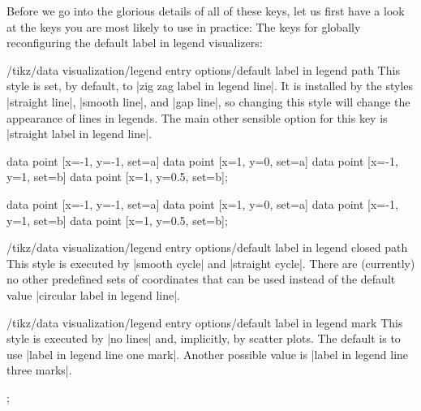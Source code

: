 Before we go into the glorious details of all of these keys, let us first have
a look at the keys you are most likely to use in practice: The keys for
globally reconfiguring the default label in legend visualizers:
%
\begin{stylekey}{/tikz/data visualization/legend entry options/default label in legend path}
    This style is set, by default, to |zig zag label in legend line|. It is
    installed by the styles |straight line|, |smooth line|, and |gap line|, so
    changing this style will change the appearance of lines in legends. The
    main other sensible option for this key is |straight label in legend line|.
\begin{codeexample}[width=5cm]
\tikz \datavisualization [
  school book axes, visualize as line/.list={a,b},
  style sheet=vary dashing,
  a={label in legend={text=a}},  b={label in legend={text=b}}]
data point [x=-1, y=-1, set=a]   data point [x=1, y=0, set=a]
data point [x=-1, y=1,  set=b]   data point [x=1, y=0.5, set=b];
\end{codeexample}
\begin{codeexample}[width=5cm]
\tikz \datavisualization [
  school book axes, visualize as line/.list={a,b},
  legend entry options/default label in legend path/.style=
    straight label in legend line,
  style sheet=vary dashing,
  a={label in legend={text=a}},  b={label in legend={text=b}}]
data point [x=-1, y=-1, set=a]   data point [x=1, y=0, set=a]
data point [x=-1, y=1,  set=b]   data point [x=1, y=0.5, set=b];
\end{codeexample}
\end{stylekey}
%
\begin{stylekey}{/tikz/data visualization/legend entry options/default label in legend closed path}
    This style is executed by |smooth cycle| and |straight cycle|. There are
    (currently) no other predefined sets of coordinates that can be used
    instead of the default value |circular label in legend line|.
\end{stylekey}

\begin{stylekey}{/tikz/data visualization/legend entry options/default label in legend mark}
    This style is executed by |no lines| and, implicitly, by scatter plots. The
    default is to use |label in legend line one mark|. Another possible value
    is |label in legend line three marks|.
\begin{codeexample}[width=5cm]
\tikz \datavisualization [
  visualize as scatter/.list={a,b,c},
  style sheet=cross marks,
  legend entry options/default label in legend mark/.style=
    label in legend three marks,
  a={label in legend={text=example a}},
  b={label in legend={text=example b}},
  c={label in legend={text=example c}}];
\end{codeexample}
\end{stylekey}

